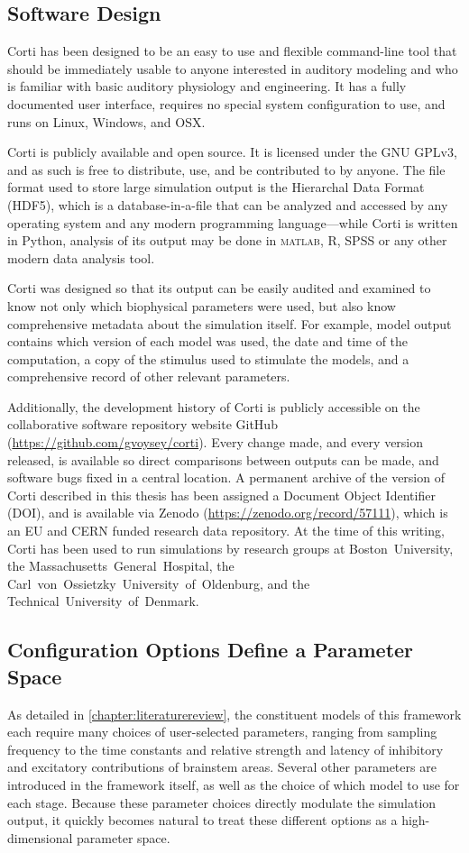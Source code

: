 \subsection{Software Design} %
\label{sub:software_design}
Corti has been designed to be an easy to use and flexible command-line tool that should be immediately usable to anyone interested in auditory modeling and who is familiar with basic auditory physiology and engineering.  It has a fully documented user interface, requires no special system configuration to use, and runs on Linux, Windows, and OSX.

Corti is publicly available and open source. It is licensed under the GNU GPLv3, and as such is free to distribute, use, and be contributed to by anyone.  The file format used to store large simulation output is the Hierarchal Data Format (HDF5), which is a database-in-a-file that can be analyzed and accessed by any operating system and any modern programming language---while Corti is written in Python, analysis of its output may be done in \textsc{matlab}, R, SPSS or any other modern data analysis tool.

Corti was designed so that its output can be easily audited and examined to know not only which biophysical parameters were used, but also know comprehensive metadata about the simulation itself.  For example, model output contains which version of each model was used, the date and time of the computation, a copy of the stimulus used to stimulate the models, and a comprehensive record of other relevant parameters. 

Additionally, the development history of Corti is publicly accessible on the collaborative software repository website GitHub (\url{https://github.com/gvoysey/corti}).  Every change made, and every version released, is available so direct comparisons between outputs can be made, and software bugs fixed in a central location.  A permanent archive of the version of Corti described in this thesis has been assigned a Document Object Identifier (DOI), and is available via Zenodo (\url{https://zenodo.org/record/57111}), which is an EU and CERN funded research data repository.  At the time of this writing, Corti has been used to run simulations by research groups at Boston~University, the Massachusetts~General~Hospital, the Carl~von~Ossietzky~University~of~Oldenburg, and the Technical~University~of~Denmark.  

\subsection{Configuration Options Define a Parameter Space}
As detailed in \autoref{chapter:literaturereview}, the constituent models of this framework each require many choices of user-selected parameters, ranging from sampling frequency to the time constants and relative strength and latency of inhibitory and excitatory contributions of brainstem areas. Several other parameters are introduced in the framework itself, as well as the choice of which model to use for each stage. Because these parameter choices directly modulate the simulation output, it quickly becomes natural to treat these different options as a high-dimensional parameter space.  


